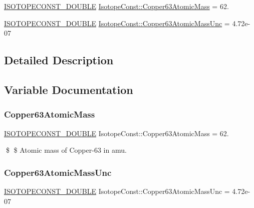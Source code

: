 \begin{DoxyCompactItemize}
\item 
\mbox{\hyperlink{group___isotope_const-_macros_ga8f45a7272ce02c0b4c65c44636ed719a}{I\+S\+O\+T\+O\+P\+E\+C\+O\+N\+S\+T\+\_\+\+D\+O\+U\+B\+LE}} \mbox{\hyperlink{group___isotope_const-_copper-_cu63_ga55f4d3ec369ecfcd951d4360d937e294}{Isotope\+Const\+::\+Copper63\+Atomic\+Mass}} = 62.
\item 
\mbox{\hyperlink{group___isotope_const-_macros_ga8f45a7272ce02c0b4c65c44636ed719a}{I\+S\+O\+T\+O\+P\+E\+C\+O\+N\+S\+T\+\_\+\+D\+O\+U\+B\+LE}} \mbox{\hyperlink{group___isotope_const-_copper-_cu63_ga6419b9d384d3402c9d496b8a5e64584f}{Isotope\+Const\+::\+Copper63\+Atomic\+Mass\+Unc}} = 4.\+72e-\/07
\end{DoxyCompactItemize}


\subsection{Detailed Description}


\subsection{Variable Documentation}
\mbox{\label{group___isotope_const-_copper-_cu63_ga55f4d3ec369ecfcd951d4360d937e294}} 
\subsubsection{\texorpdfstring{Copper63\+Atomic\+Mass}{Copper63AtomicMass}}
{\footnotesize\ttfamily \mbox{\hyperlink{group___isotope_const-_macros_ga8f45a7272ce02c0b4c65c44636ed719a}{I\+S\+O\+T\+O\+P\+E\+C\+O\+N\+S\+T\+\_\+\+D\+O\+U\+B\+LE}} Isotope\+Const\+::\+Copper63\+Atomic\+Mass = 62.}

\$ \$ Atomic mass of Copper-\/63 in amu. \mbox{\label{group___isotope_const-_copper-_cu63_ga6419b9d384d3402c9d496b8a5e64584f}} 
\subsubsection{\texorpdfstring{Copper63\+Atomic\+Mass\+Unc}{Copper63AtomicMassUnc}}
{\footnotesize\ttfamily \mbox{\hyperlink{group___isotope_const-_macros_ga8f45a7272ce02c0b4c65c44636ed719a}{I\+S\+O\+T\+O\+P\+E\+C\+O\+N\+S\+T\+\_\+\+D\+O\+U\+B\+LE}} Isotope\+Const\+::\+Copper63\+Atomic\+Mass\+Unc = 4.\+72e-\/07}

